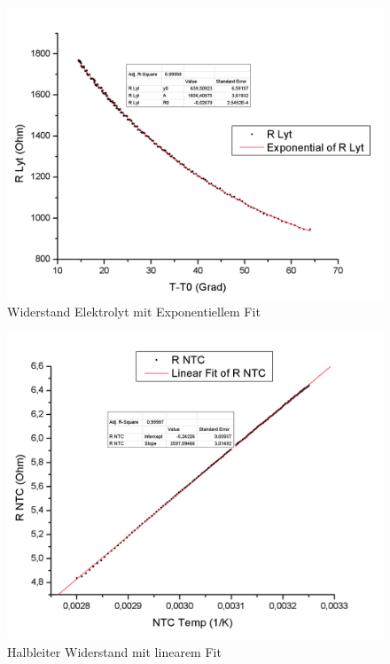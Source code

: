 \documentclass[12pt,a4paper]{article}
\begin{document}
\begin{figure}[H]
	\centering
	\includegraphics[scale=0.60]{./figure/Rlyt_t_t0.png}
	\caption{Widerstand Elektrolyt mit Exponentiellem Fit}
	\label{fig:rlyt}
\end{figure}
\begin{multicols}{2}

\end{multicols}
\begin{figure}[H]
	\centering
	\includegraphics[scale=0.60]{./figure/RNTC_NTC_temp.png}
	\caption{Halbleiter Widerstand mit linearem Fit}
	\label{fig:rntc}
\end{figure}
\end{document}
